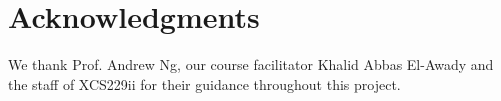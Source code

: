 \section*{Acknowledgments}

We thank Prof. Andrew Ng, our course facilitator Khalid Abbas El-Awady and the staff of XCS229ii for their guidance throughout this project.
